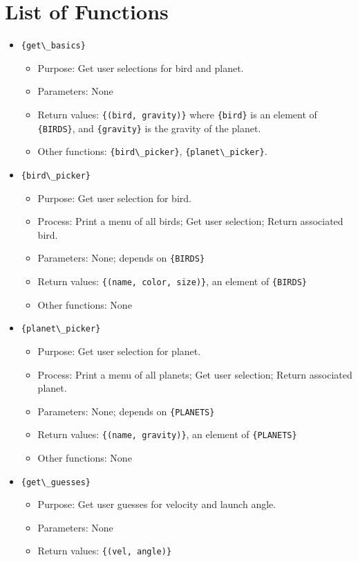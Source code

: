 \documentclass{article}
\newcommand{\code}[1]{\Verb/{#1}/}
\begin{document}
\section{List of Functions}
\begin{itemize}
	\item \code{get\_basics}
		\begin{itemize}
			\item Purpose: Get user selections for bird and planet.
			\item Parameters: None
			\item Return values: \code{(bird, gravity)} where \code{bird} is an element of \code{BIRDS}, and \code{gravity} is the gravity of the planet.
			\item Other functions: \code{bird\_picker}, \code{planet\_picker}.
		\end{itemize}
	\item \code{bird\_picker}
		\begin{itemize}
			\item Purpose: Get user selection for bird.
			\item Process: Print a menu of all birds; Get user selection; Return associated bird.
			\item Parameters: None; depends on \code{BIRDS}
			\item Return values: \code{(name, color, size)}, an element of \code{BIRDS}
			\item Other functions: None
		\end{itemize}
	\item \code{planet\_picker}
		\begin{itemize}
			\item Purpose: Get user selection for planet.
			\item Process: Print a menu of all planets; Get user selection; Return associated planet.
			\item Parameters: None; depends on \code{PLANETS}
			\item Return values: \code{(name, gravity)}, an element of \code{PLANETS}
			\item Other functions: None
		\end{itemize}
	\item \code{get\_guesses}
		\begin{itemize}
			\item Purpose: Get user guesses for velocity and launch angle.
			\item Parameters: None
			\item Return values: \code{(vel, angle)}

\end{itemize}
\end{itemize}
\end{document}

